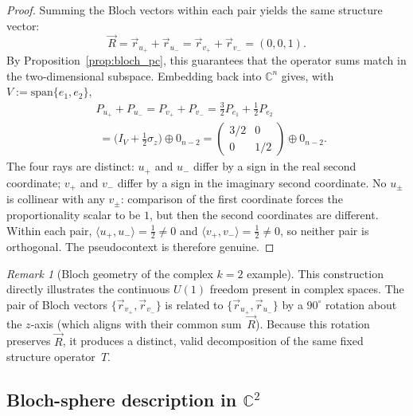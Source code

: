 \documentclass[
  twocolumn,
  aps,
  pra,
  floatfix,
  amsmath,amssymb,
  longbibliography
]{revtex4-2}
\theoremstyle{definition}
\theoremstyle{remark}
\newtheorem{remark}[theorem]{Remark}
\begin{document}
\begin{proof}
Summing the Bloch vectors within each pair yields the same structure
vector:
\[
  \vec{R}=\vec{r}_{u_+}+\vec{r}_{u_-}
        =\vec{r}_{v_+}+\vec{r}_{v_-}=(0,0,1).
\]
By Proposition~\ref{prop:bloch_pc}, this guarantees that the operator
sums match in the two-dimensional subspace.  Embedding back into
$\mathbb{C}^n$ gives, with $V:=\mathrm{span}\{e_1,e_2\}$,
\begin{align}
  &P_{u_+}+P_{u_-}=P_{v_+}+P_{v_-}
   =\tfrac{3}{2}P_{e_1}+\tfrac{1}{2}P_{e_2}\nonumber\\
  &\;=\bigl(I_V+\tfrac{1}{2}\sigma_z\bigr)\oplus 0_{n-2}
   =\begin{pmatrix}3/2&0\\0&1/2\end{pmatrix}\oplus 0_{n-2}.\nonumber
\end{align}
The four rays are distinct: $u_+$ and $u_-$ differ by a sign in the
real second coordinate; $v_+$ and $v_-$ differ by a sign in the
imaginary second coordinate.
No \(u_\pm\) is collinear with any \(v_\pm\): comparison of the first
coordinate forces the proportionality scalar to be \(1\), but then the
second coordinates are different.
Within each pair, $\langle u_+,u_-\rangle=\tfrac{1}{2}\neq 0$ and
$\langle v_+,v_-\rangle=\tfrac{1}{2}\neq 0$, so neither pair is
orthogonal.  The pseudocontext is therefore genuine.
\end{proof}

\begin{remark}[Bloch geometry of the complex $k=2$ example]
This construction directly illustrates the continuous $U(1)$ freedom
present in complex spaces.  The pair of Bloch vectors
$\{\vec{r}_{v_+},\vec{r}_{v_-}\}$ is related to
$\{\vec{r}_{u_+},\vec{r}_{u_-}\}$ by a $90^\circ$ rotation about the
$z$-axis (which aligns with their common sum~$\vec{R}$).  Because this
rotation preserves $\vec{R}$, it produces a distinct, valid
decomposition of the same fixed structure operator~$T$.
\end{remark}


\subsection{Bloch-sphere description in \texorpdfstring{$\mathbb{C}^2$}{C2}}
\end{document}
